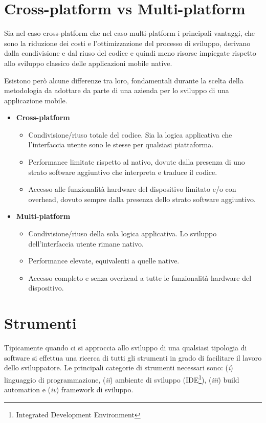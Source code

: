 \section{Cross-platform vs Multi-platform}
Sia nel caso cross-platform che nel caso multi-platform i principali vantaggi, che sono la riduzione dei costi e l'ottimizzazione del processo di sviluppo, derivano dalla condivisione e dal riuso del codice e quindi meno risorse impiegate rispetto allo sviluppo classico delle applicazioni mobile native.

Esistono però alcune differenze tra loro, fondamentali durante la scelta della metodologia da adottare da parte di una azienda per lo sviluppo di una applicazione mobile.
\begin{itemize}
    \item \textbf{Cross-platform}
    \begin{itemize}
        \item Condivisione/riuso totale del codice. Sia la logica applicativa che l'interfaccia utente sono le stesse per qualsiasi piattaforma.
        \item Performance limitate rispetto al nativo, dovute dalla presenza di uno strato software aggiuntivo che interpreta e traduce il codice.
        \item Accesso alle funzionalità hardware del dispositivo limitato e/o con overhead, dovuto sempre dalla presenza dello strato software aggiuntivo.
    \end{itemize}
    \item \textbf{Multi-platform}
    \begin{itemize}
        \item Condivisione/riuso della sola logica applicativa. Lo sviluppo dell'interfaccia utente rimane nativo.
        \item Performance elevate, equivalenti a quelle native.
        \item Accesso completo e senza overhead a tutte le funzionalità hardware del dispositivo.
    \end{itemize}
\end{itemize}

\section{Strumenti}
Tipicamente quando ci si approccia allo sviluppo di una qualsiasi tipologia di software si effettua una ricerca di tutti gli strumenti in grado di facilitare il lavoro dello sviluppatore. Le principali categorie di strumenti necessari sono: (\textit{i}) linguaggio di programmazione, (\textit{ii}) ambiente di sviluppo (IDE\footnote{Integrated Development Environment}), (\textit{iii}) build automation e (\textit{iv}) framework di sviluppo.

